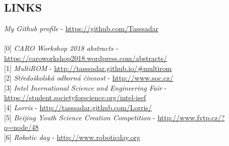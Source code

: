 \documentclass[margin]{res}
\begin{document}
\begin{resume}
\linespread{1.6}
\section{LINKS}
\textit{My Github profile} - \url{https://github.com/Tasssadar} \\
\\
\label{caro}[0] \textit{CARO Workshop 2018 abstracts} - \\\phantom{[0]} \url{https://caroworkshop2018.wordpress.com/abstracts/} \\
\label{multirom}[1] \textit{MultiROM} - \url{http://tasssadar.github.io/#multirom} \\
\label{soc}[2] \textit{Středoškolská odborná činnost} - \url{http://www.soc.cz/} \\
\label{isef}[3] \textit{Intel Inernational Science and Engineering Fair} - \\\phantom{[3] }\url{https://student.societyforscience.org/intel-isef} \\
\label{lorris}[4] \textit{Lorris} - \url{http://tasssadar.github.com/Lorris/} \\
\label{byscc}[5] \textit{Beijing Youth Science Creation Competition} - \url{http://www.fvtp.cz/?q=node/48} \\
\label{day}[6] \textit{Robotic day} - \url{http://www.roboticday.org} \\


\end{resume}
\end{document}
